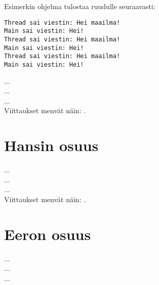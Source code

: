 \documentclass[11pt,oneside,a4paper]{article}
\begin{document}
Esimerkin ohjelma tulostaa ruudulle seuraavasti:

\begin{verbatim}
Thread sai viestin: Hei maailma!
Main sai viestin: Hei!
Thread sai viestin: Hei maailma!
Main sai viestin: Hei!
Thread sai viestin: Hei maailma!
Main sai viestin: Hei!
\end{verbatim}

... \\
... \\
... \\

Viittaukset menvät näin: \cite{ALE10}.

\section{Hansin osuus}
... \\
... \\
... \\

Viittaukset menvät näin: \cite{ERL99}.

\section{Eeron osuus}
... \\
... \\
... \\
\end{document}
